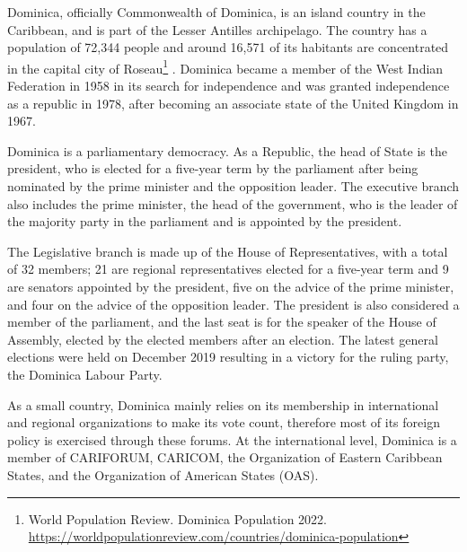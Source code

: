 \documentclass[
]{book}
\begin{document}
Dominica, officially Commonwealth of Dominica, is an island country in the Caribbean, and is part of the Lesser Antilles archipelago. The country has a population of 72,344 people and around 16,571 of its habitants are concentrated in the capital city of Roseau\footnote{World Population Review. Dominica Population 2022. \url{https://worldpopulationreview.com/countries/dominica-population}} . Dominica became a member of the West Indian Federation in 1958 in its search for independence and was granted independence as a republic in 1978, after becoming an associate state of the United Kingdom in 1967.

Dominica is a parliamentary democracy. As a Republic, the head of State is the president, who is elected for a five-year term by the parliament after being nominated by the prime minister and the opposition leader. The executive branch also includes the prime minister, the head of the government, who is the leader of the majority party in the parliament and is appointed by the president.

The Legislative branch is made up of the House of Representatives, with a total of 32 members; 21 are regional representatives elected for a five-year term and 9 are senators appointed by the president, five on the advice of the prime minister, and four on the advice of the opposition leader. The president is also considered a member of the parliament, and the last seat is for the speaker of the House of Assembly, elected by the elected members after an election. The latest general elections were held on December 2019 resulting in a victory for the ruling party, the Dominica Labour Party.

As a small country, Dominica mainly relies on its membership in international and regional organizations to make its vote count, therefore most of its foreign policy is exercised through these forums. At the international level, Dominica is a member of CARIFORUM, CARICOM, the Organization of Eastern Caribbean States, and the Organization of American States (OAS).
\end{document}
